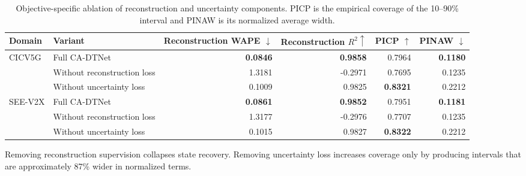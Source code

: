\begin{table}[t]
\centering
\caption{Objective-specific ablation of reconstruction and uncertainty
components. PICP is the empirical coverage of the 10--90\% interval and PINAW
is its normalized average width.}
\label{tab:objective_specific_ablation}
\setlength{\tabcolsep}{5pt}
\begin{tabular}{llrrrr}
\toprule
Domain & Variant & Reconstruction WAPE $\downarrow$ & Reconstruction $R^2 \uparrow$ & PICP $\uparrow$ & PINAW $\downarrow$ \\
\midrule
\multirow{3}{*}{CICV5G}
& Full CA-DTNet                 & \textbf{0.0846} & \textbf{0.9858} & 0.7964 & \textbf{0.1180} \\
& Without reconstruction loss  & 1.3181          & -0.2971         & 0.7695 & 0.1235 \\
& Without uncertainty loss     & 0.1009          & 0.9825          & \textbf{0.8321} & 0.2212 \\
\midrule
\multirow{3}{*}{SEE-V2X}
& Full CA-DTNet                 & \textbf{0.0861} & \textbf{0.9852} & 0.7951 & \textbf{0.1181} \\
& Without reconstruction loss  & 1.3177          & -0.2976         & 0.7707 & 0.1235 \\
& Without uncertainty loss     & 0.1015          & 0.9827          & \textbf{0.8322} & 0.2212 \\
\bottomrule
\end{tabular}
\vspace{1mm}
\parbox{0.98\textwidth}{\footnotesize Removing reconstruction supervision
collapses state recovery. Removing uncertainty loss increases coverage only by
producing intervals that are approximately 87\% wider in normalized terms.}
\end{table}
